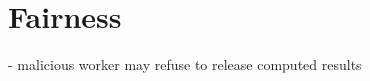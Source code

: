 \section{Fairness} \label{sect:fairness}

- malicious worker may refuse to release computed results 
